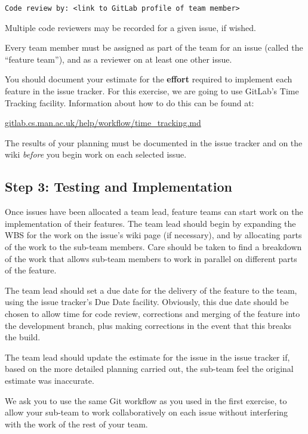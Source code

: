 \documentclass[
]{book}
\begin{document}
\texttt{Code\ review\ by:\ \textless{}link\ to\ GitLab\ profile\ of\ team\ member\textgreater{}}

Multiple code reviewers may be recorded for a given issue, if wished.

Every team member must be assigned as part of the team for an issue (called the ``feature team''), and as a reviewer on at least one other issue.

You should document your estimate for the \textbf{effort} required to implement each feature in the issue tracker. For this exercise, we are going to use GitLab's Time Tracking facility. Information about how to do this can be found at:

\href{https://gitlab.cs.man.ac.uk/help/workflow/time_tracking.md}{gitlab.cs.man.ac.uk/help/workflow/time\_tracking.md}

The results of your planning must be documented in the issue tracker and on the wiki \emph{before} you begin work on each selected issue.

\hypertarget{timp}{%
\subsection{Step 3: Testing and Implementation}\label{timp}}

Once issues have been allocated a team lead, feature teams can start work on the implementation of their features. The team lead should begin by expanding the WBS for the work on the issue's wiki page (if necessary), and by allocating parts of the work to the sub-team members. Care should be taken to find a breakdown of the work that allows sub-team members to work in parallel on different parts of the feature.

The team lead should set a due date for the delivery of the feature to the team, using the issue tracker's Due Date facility. Obviously, this due date should be chosen to allow time for code review, corrections and merging of the feature into the development branch, plus making corrections in the event that this breaks the build.

The team lead should update the estimate for the issue in the issue tracker if, based on the more detailed planning carried out, the sub-team feel the original estimate was inaccurate.

We ask you to use the same Git workflow as you used in the first exercise, to allow your sub-team to work collaboratively on each issue without interfering with the work of the rest of your team.
\end{document}
